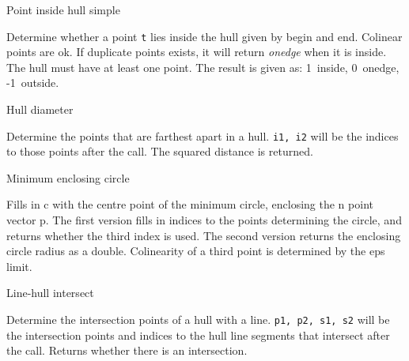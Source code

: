\begin{algorithm}{Point inside hull simple}

Determine whether a point {\tt t} lies inside the hull given by
begin and end. Colinear points are ok. If duplicate points exists, it will
return \emph{onedge} when it is inside. The hull must have at least one point.
The result is given as: 1~inside, 0~onedge, -1~outside.
\end{algorithm}

\begin{algorithm}{Hull diameter}

Determine the points that are farthest apart in a hull.
{\tt i1, i2} will be the indices to those points after the call.
The squared distance is returned.
\end{algorithm}

\begin{algorithm}{Minimum enclosing circle}

Fills in c with the centre point of the minimum circle, enclosing the
n point vector p. The first version fills in indices to the points
determining the circle, and returns whether the third index is used.
The second version returns the enclosing circle radius as a double.
Colinearity of a third point is determined by the eps limit.
\end{algorithm}

\begin{algorithm}{Line-hull intersect}

Determine the intersection points of a hull with a line.
{\tt p1, p2, s1, s2} will be the intersection points and indices to the hull
line segments that intersect after the call. Returns whether there is an
intersection.
\end{algorithm}
